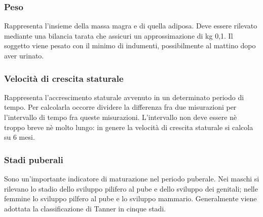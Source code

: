 \subsubsection*{Peso}
Rappresenta l'insieme della massa magra e di quella adiposa. Deve essere rilevato mediante una bilancia tarata che assicuri un approssimazione di kg 0,1. Il soggetto viene pesato con il minimo di indumenti, possibilmente al mattino dopo aver urinato.

\subsubsection*{Velocità di crescita staturale}
Rappresenta l'accrescimento staturale avvenuto in un determinato periodo di tempo. Per calcolarla occorre dividere la differenza fra due misurazioni per l'intervallo di tempo fra queste misurazioni. L'intervallo non deve essere nè troppo breve nè molto lungo: in genere la velocità di crescita staturale si calcola su 6 mesi.

\subsubsection*{Stadi puberali}
Sono un'importante indicatore di maturazione nel periodo puberale\cite{benso2001auxologia}. Nei maschi si rilevano lo stadio dello sviluppo pilifero al pube e dello sviluppo dei genitali; nelle femmine lo sviluppo pilfero al pube e lo sviluppo mammario. Generalmente viene adottata la classificazione di Tanner\cite{tanner1990foetus} in cinque stadi.

